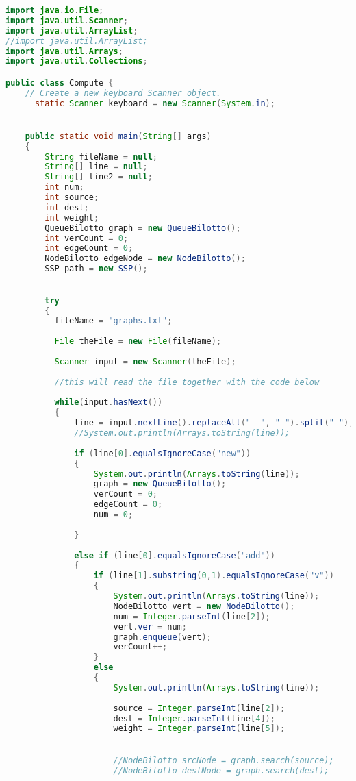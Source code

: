 \documentclass[letterpaper, 10pt]{article}
\begin{document}
\begin{lstlisting}[language = java]
import java.io.File;
import java.util.Scanner;
import java.util.ArrayList;
//import java.util.ArrayList;
import java.util.Arrays;
import java.util.Collections;

public class Compute {
	// Create a new keyboard Scanner object.
	  static Scanner keyboard = new Scanner(System.in);


	public static void main(String[] args) 
	{
		String fileName = null;
	    String[] line = null;
	    String[] line2 = null;
	    int num;
	    int source;
	    int dest;
	    int weight;
	    QueueBilotto graph = new QueueBilotto();
	    int verCount = 0;
	    int edgeCount = 0;
	    NodeBilotto edgeNode = new NodeBilotto();
	    SSP path = new SSP();

	   
	    try
	    { 
	      fileName = "graphs.txt";
	     
	      File theFile = new File(fileName);   
	      
	      Scanner input = new Scanner(theFile);
	      
	      //this will read the file together with the code below         
	      
	      while(input.hasNext())
	      {
	    	  line = input.nextLine().replaceAll("  ", " ").split(" ");
	    	  //System.out.println(Arrays.toString(line));
	    	  
	    	  if (line[0].equalsIgnoreCase("new"))
	    	  {
	    		  System.out.println(Arrays.toString(line));
	    		  graph = new QueueBilotto();
	    		  verCount = 0;
	    		  edgeCount = 0;
	    		  num = 0;
	    		  
	    	  }
	    	  
	    	  else if (line[0].equalsIgnoreCase("add"))
	    	  {
	    		  if (line[1].substring(0,1).equalsIgnoreCase("v"))
	    		  {
	    			  System.out.println(Arrays.toString(line));
	    			  NodeBilotto vert = new NodeBilotto();
	    			  num = Integer.parseInt(line[2]);
	    			  vert.ver = num;
	    			  graph.enqueue(vert);
	    			  verCount++;
	    		  }
	    		  else
	    		  {
	    			  System.out.println(Arrays.toString(line));
	    			  
	    			  source = Integer.parseInt(line[2]);
	    			  dest = Integer.parseInt(line[4]);
	    			  weight = Integer.parseInt(line[5]);
	    			  

	    			  //NodeBilotto srcNode = graph.search(source);
	    			  //NodeBilotto destNode = graph.search(dest);
	    			  

\end{lstlisting}
\end{document}
